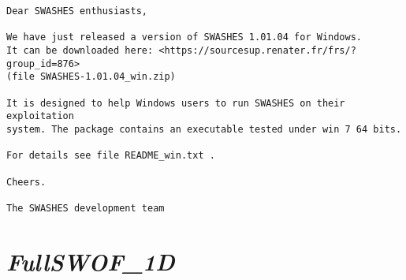 \documentclass[a4paper, 11pt]{article}
\newcommand{\FullSWOFoneD}{\emph{FullSWOF\_1D}}
\begin{document}
\begin{enumerate}
\begin{verbatim}
Dear SWASHES enthusiasts,

We have just released a version of SWASHES 1.01.04 for Windows.
It can be downloaded here: <https://sourcesup.renater.fr/frs/?group_id=876> 
(file SWASHES-1.01.04_win.zip)

It is designed to help Windows users to run SWASHES on their exploitation 
system. The package contains an executable tested under win 7 64 bits.

For details see file README_win.txt .

Cheers.

The SWASHES development team 
\end{verbatim}
\end{enumerate}


\section{\FullSWOFoneD{}}
\end{document}
